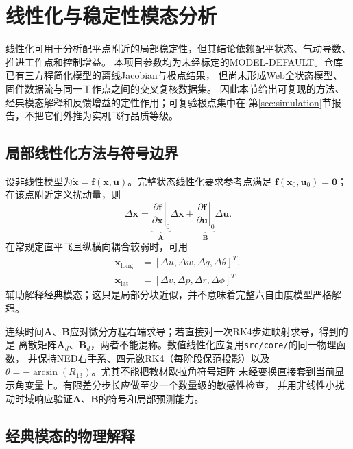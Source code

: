 \section{线性化与稳定性模态分析}
\label{sec:stability}

线性化可用于分析配平点附近的局部稳定性，但其结论依赖配平状态、气动导数、推进工作点和控制增益。
本项目参数均为未经标定的MODEL-DEFAULT。仓库已有三方程简化模型的离线Jacobian与极点结果，
但尚未形成Web全状态模型、固件数据流与同一工作点之间的交叉复核数据集。
因此本节给出可复现的方法、经典模态解释和反馈增益的定性作用；可复验极点集中在
第\ref{sec:simulation}节报告，不把它们外推为实机飞行品质等级。

\subsection{局部线性化方法与符号边界}

设非线性模型为$\dot{\bm{x}}=\bm{f}(\bm{x},\bm{u})$。完整状态线性化要求参考点满足
$\bm{f}(\bm{x}_0,\bm{u}_0)=\bm{0}$；在该点附近定义扰动量，则
\begin{equation}
    \Delta\dot{\bm{x}}
    = \underbrace{\left.\frac{\partial\bm{f}}{\partial\bm{x}}\right|_0}_{\bm{A}}
      \Delta\bm{x}
    + \underbrace{\left.\frac{\partial\bm{f}}{\partial\bm{u}}\right|_0}_{\bm{B}}
      \Delta\bm{u} .
    \label{eq:linear_state_space}
\end{equation}
在常规定直平飞且纵横向耦合较弱时，可用
\begin{align}
    \bm{x}_{\mathrm{long}} &= [\Delta u,\Delta w,\Delta q,\Delta\theta]^T,\\
    \bm{x}_{\mathrm{lat}}  &= [\Delta v,\Delta p,\Delta r,\Delta\phi]^T
\end{align}
辅助解释经典模态；这只是局部分块近似，并不意味着完整六自由度模型严格解耦。

连续时间$\bm A$、$\bm B$应对微分方程右端求导；若直接对一次RK4步进映射求导，得到的是
离散矩阵$\bm A_d$、$\bm B_d$，两者不能混称。数值线性化应复用\texttt{src/core/}的同一物理函数，
并保持NED右手系、四元数RK4（每阶段保范投影）以及$\theta=-\arcsin(R_{13})$。尤其不能把教材欧拉角符号矩阵
未经变换直接套到当前显示角变量上。有限差分步长应做至少一个数量级的敏感性检查，
并用非线性小扰动时域响应验证$\bm{A}$、$\bm{B}$的符号和局部预测能力。

\subsection{经典模态的物理解释}

